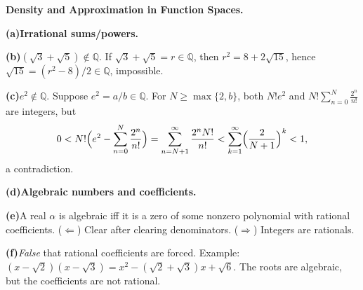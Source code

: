 \begin{problem}[CP-II-0211]
\label{prob:cp-ii-0211}
\textbf{Density and Approximation in Function Spaces.}


		\par\smallskip\noindent\textbf{(a)}\quad \textbf{Irrational sums/powers.}

			\par\smallskip\noindent\textbf{(b)}\quad $(\sqrt3+\sqrt5)\notin\mathbb Q$. If $\sqrt3+\sqrt5=r\in\mathbb Q$, then
			$r^2=8+2\sqrt{15}$, hence $\sqrt{15}=(r^2-8)/2\in\mathbb Q$, impossible.
			\par\smallskip\noindent\textbf{(c)}\quad $e^2\notin\mathbb Q$. Suppose $e^2=a/b\in\mathbb Q$. For $N\ge\max\{2,b\}$,
			both $N!e^2$ and $N!\sum_{n=0}^{N}\frac{2^n}{n!}$ are integers, but
			\[
			0<N!\Bigl(e^2-\sum_{n=0}^{N}\frac{2^n}{n!}\Bigr)
			=\sum_{n=N+1}^{\infty}\frac{2^n N!}{n!}
			<\sum_{k=1}^{\infty}\Bigl(\frac{2}{N+1}\Bigr)^k<1,
			\]
			a contradiction.

		\par\smallskip\noindent\textbf{(d)}\quad \textbf{Algebraic numbers and coefficients.}

			\par\smallskip\noindent\textbf{(e)}\quad A real $\alpha$ is algebraic iff it is a zero of some nonzero polynomial
			with rational coefficients. ($\Leftarrow$) Clear after clearing denominators.
			($\Rightarrow$) Integers are rationals.
			\par\smallskip\noindent\textbf{(f)}\quad \emph{False} that rational coefficients are forced. Example:
			$(x-\sqrt2)(x-\sqrt3)=x^2-(\sqrt2+\sqrt3)x+\sqrt6$. The roots are algebraic,
			but the coefficients are not rational.
\end{problem}

